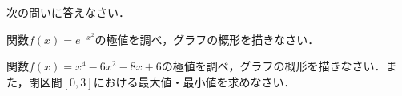 \begin{questions}
	\setlength\answerlinelength{1in}
	
	\newpage
	\question
	次の問いに答えなさい．

	\newpage
	\question
	関数$\displaystyle f(x) = e^{-x^2}$の極値を調べ，グラフの概形を描きなさい．
	
	\newpage
	\question
	関数$\displaystyle f(x) = x^4-6x^2-8x+6$の極値を調べ，グラフの概形を描きなさい．また，閉区間$[0, 3]$における最大値・最小値を求めなさい．
\end{questions}